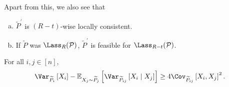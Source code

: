 Apart from this, we also see that
\begin{enumerate}[(a)]
	\item \(\widetilde{P} ^\prime \) is \((R-t)\)-wise locally consistent.
	\item If \(\widetilde{P} \) was \(\Lass_R(\mathcal{P})\), \(\widetilde{P} ^\prime \) is feasible for \(\Lass_{R-t} (\mathcal{P})\).
\end{enumerate}

\begin{lemma}\label{lma:conditioning-reduces-variance}
	For all \(i, j\in [n]\),
	\[
		\Var_{\widetilde{P} _i}\left[X_i \right] - \mathbb{E}_{X_j\sim \widetilde{P} _j}\left[\Var_{\widetilde{P} _{ij}}\left[X_i \mid X_j \right]  \right] \geq 4\Cov_{\widetilde{P} _{ij}}\left[ X_i, X_j\right] ^{2} .
	\]
\end{lemma}
